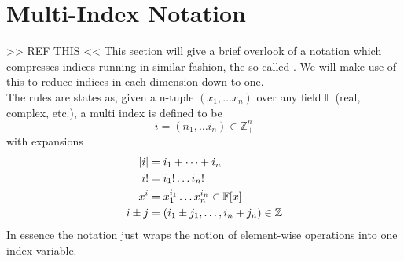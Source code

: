 \section{Multi-Index Notation\label{sec:multiIndexNotation}}
    >> REF THIS <<
    This section will give a brief overlook of a notation which compresses
    indices running in similar fashion, the so-called . We will make use of this to reduce indices in each dimension
    down to one. \\
    The rules are states as, given a n-tuple $(x_1,\dots x_n)$ over any field
    $\mathbb{F}$ (real, complex, etc.), a multi index is defined to be 
        \begin{equation}
            i=(n_1,\dots i_n)\in \mathbb{Z}^n_+
        \end{equation}
    with expansions
        \begin{equation}
            \begin{aligned}
                \abs{i} &= i_1 + \dots + i_n \\
                i! &= i_1! \dots i_n! \\
                x^i &= x^{i_1}_1 \dots x^{i_n}_n \in \mathbb{F}[x] \\
                i \pm j &= (i_1 \pm j_1,\dots, i_n+j_n) \in \mathbb{Z}
            \end{aligned}
        \end{equation}
    In essence the notation just wraps the notion of element-wise operations
    into one index variable.
